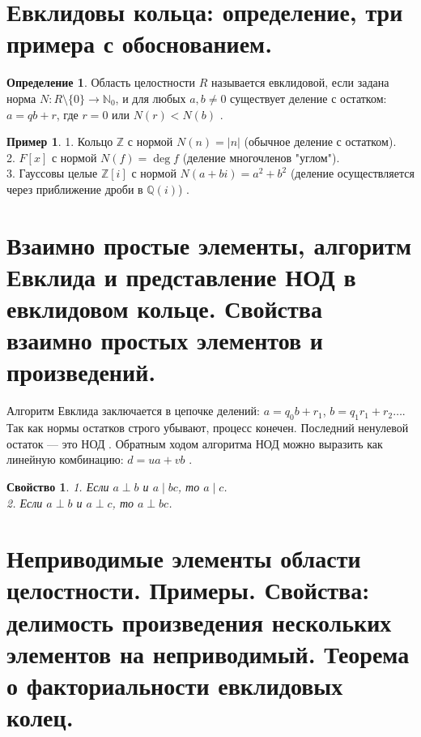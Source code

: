 \documentclass[12pt, a4paper]{article}
\theoremstyle{definition}
\newtheorem{definition}{Определение}[section]
\newtheorem{example}{Пример}[section]
\theoremstyle{plain}
\newtheorem{property}{Свойство}[section]
\begin{document}
	\newpage
	
	\section{Евклидовы кольца: определение, три примера с обоснованием.}
	
	\begin{definition}
		Область целостности $R$ называется евклидовой, если задана норма $N: R \setminus \{0\} \to \mathbb{N}_0$, и для любых $a, b \neq 0$ существует деление с остатком: $a = qb + r$, где $r=0$ или $N(r) < N(b)$ .
	\end{definition}
	
	\begin{example}
		1. Кольцо $\mathbb{Z}$ с нормой $N(n) = |n|$ (обычное деление с остатком). \\
		2. $F[x]$ с нормой $N(f) = \deg f$ (деление многочленов "углом"). \\
		3. Гауссовы целые $\mathbb{Z}[i]$ с нормой $N(a+bi) = a^2+b^2$ (деление осуществляется через приближение дроби в $\mathbb{Q}(i)$) .
	\end{example}
	
	\newpage
	
	\section{Взаимно простые элементы, алгоритм Евклида и представление НОД в евклидовом кольце. Свойства взаимно простых элементов и произведений.}
	
	Алгоритм Евклида заключается в цепочке делений: $a = q_0 b + r_1$, $b = q_1 r_1 + r_2 \dots$. Так как нормы остатков строго убывают, процесс конечен. Последний ненулевой остаток — это НОД . Обратным ходом алгоритма НОД можно выразить как линейную комбинацию: $d = ua+vb$ .
	
	\begin{property}
		1. Если $a \perp b$ и $a \mid bc$, то $a \mid c$. \\
		2. Если $a \perp b$ и $a \perp c$, то $a \perp bc$.
	\end{property}
	
	\newpage
	
	\section{Неприводимые элементы области целостности. Примеры. Свойства: делимость произведения нескольких элементов на неприводимый. Теорема о факториальности евклидовых колец.}
	
\end{document}
